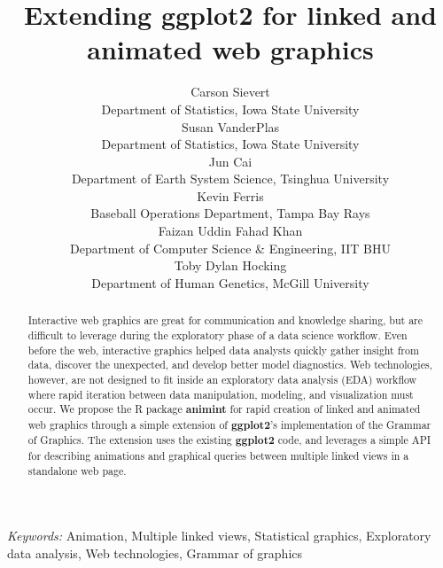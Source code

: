\documentclass[12pt,]{article}
\theoremstyle{definition}
\theoremstyle{definition}
\theoremstyle{definition}
\theoremstyle{remark}
\begin{document}
\def\spacingset#1{\renewcommand{\baselinestretch}%
{#1}\small\normalsize} \spacingset{1}

\title{\bf Extending ggplot2 for linked and animated web graphics}
\author{
  Carson Sievert \\ 
  Department of Statistics, Iowa State University \\
  Susan VanderPlas \\
  Department of Statistics, Iowa State University \\
  Jun Cai \\
  Department of Earth System Science, Tsinghua University\\
  Kevin Ferris \\
  Baseball Operations Department, Tampa Bay Rays \\
  Faizan Uddin Fahad Khan \\
  Department of Computer Science \& Engineering, IIT BHU \\
  Toby Dylan Hocking \\ 
  Department of Human Genetics, McGill University \\
}
\maketitle

\bigskip
\begin{abstract}
Interactive web graphics are great for communication and knowledge
sharing, but are difficult to leverage during the exploratory phase of a
data science workflow. Even before the web, interactive graphics helped
data analysts quickly gather insight from data, discover the unexpected,
and develop better model diagnostics. Web technologies, however, are not
designed to fit inside an exploratory data analysis (EDA) workflow where
rapid iteration between data manipulation, modeling, and visualization
must occur. We propose the R package \textbf{animint} for rapid creation
of linked and animated web graphics through a simple extension of
\textbf{ggplot2}'s implementation of the Grammar of Graphics. The
extension uses the existing \textbf{ggplot2} code, and leverages a
simple API for describing animations and graphical queries between
multiple linked views in a standalone web page.
\end{abstract}

\noindent
{\it Keywords:}  Animation, Multiple linked views, Statistical graphics, Exploratory data
analysis, Web technologies, Grammar of graphics
\vfill
\end{document}
